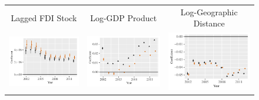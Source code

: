 \documentclass[reqno,onecolumn,letterpaper,12pt]{article}
\begin{document}
\begin{figure}[!h]
\centering
\begin{tabular}{@{\hskip -.05cm}c@{\hskip -.2cm}c@{\hskip -.2cm}c}

Lagged FDI Stock&
Log-GDP Product &
Log-Geographic Distance\\

\includegraphics[height=.165\textheight, clip=true, trim=.5cm .5cm 0cm .1cm]{figures/main_rl_plots/LDV.pdf} &
\includegraphics[height=.165\textheight, clip=true, trim=.5cm .5cm 0cm .1cm]{figures/main_rl_plots/Mass.pdf}    &
\includegraphics[height=.165\textheight, clip=true, trim=.5cm .5cm 0cm .1cm]{figures/main_rl_plots/Distance.pdf}  \\



\end{tabular}
\end{figure}
\end{document}
